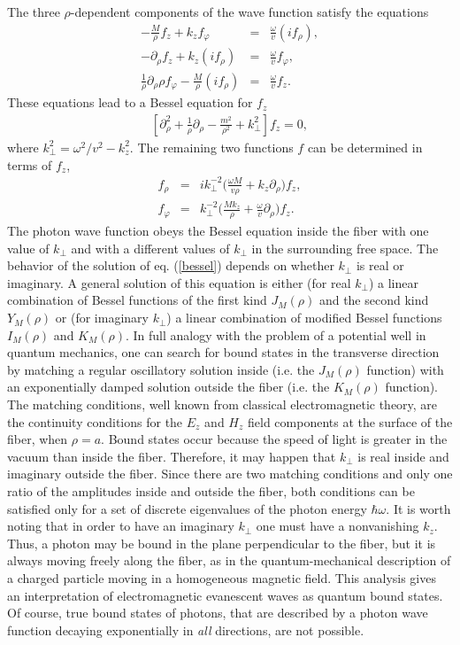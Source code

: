 \documentclass[11pt]{article}
\begin{document}
The three $\rho$-dependent components of the wave function satisfy the
equations
\begin{eqnarray}
-\frac{M}{\rho}f_z + k_z f_{\varphi} &=&
\frac{\omega}{v}(if_{\rho}),\label{cyl1}\\
-\partial_{\rho} f_z + k_z (if_{\rho}) &=&
\frac{\omega}{v}f_{\varphi},\label{cyl2}\\
\frac{1}{\rho}\partial_{\rho}\rho f_{\varphi} -
\frac{M}{\rho}(if_{\rho}) &=& \frac{\omega}{v}f_z.\label{cyl3}
\end{eqnarray}
These equations lead to a Bessel equation for $f_z$
\begin{eqnarray}
\left[\partial_{\rho}^2 + \frac{1}{\rho}\partial_{\rho} -
\frac{m^2}{\rho^2} + k_{\perp}^2\right]f_z = 0,\label{bessel}
\end{eqnarray}
where $k_{\perp}^2 = \omega^2/v^2 - k_z^2$. The remaining two functions $f$
can be determined in terms of $f_z$,
\begin{eqnarray}
 f_{\rho}
 &=& ik^{-2}_{\perp}\big(\frac{\omega M}{v\rho}
 + k_z\partial_{\rho}\big)f_z,\\
 f_{\varphi}
 &=& k^{-2}_{\perp}\big(\frac{M k_z}{\rho}
 + \frac{\omega}{v}\partial_{\rho}\big)f_z.
\end{eqnarray}
The photon wave function obeys the Bessel equation inside the fiber with one
value of $k_{\perp}$ and with a different values of $k_{\perp}$ in the surrounding free space. The behavior of the solution of eq. (\ref{bessel})
depends on whether $k_{\perp}$ is real or imaginary. A general solution of
this equation is either (for real $k_{\perp}$) a linear combination of Bessel functions of the first kind $J_M(\rho)$ and the second kind $Y_M(\rho)$ or
(for imaginary $k_{\perp}$) a linear combination of modified Bessel functions $I_M(\rho)$ and $K_M(\rho)$. In full analogy with the problem of a potential well in quantum mechanics, one can search for bound states in the transverse direction by matching a regular oscillatory solution inside (i.e. the $J_M(\rho)$ function) with an exponentially damped solution outside the fiber (i.e. the $K_M(\rho)$ function). The matching conditions, well known from classical electromagnetic theory, are the continuity conditions for the $E_z$ and $H_z$ field components at the surface of the fiber, when $\rho = a$. Bound states occur because the speed of light is greater in the vacuum than inside the fiber. Therefore, it may happen that $k_{\perp}$ is real inside and imaginary outside the fiber. Since there are two matching conditions and only one ratio of the amplitudes inside and outside the fiber, both conditions can be satisfied only for a set of discrete eigenvalues of the photon energy $\hbar\omega$. It is worth noting that in order to have an imaginary $k_{\perp}$ one must have a nonvanishing $k_z$. Thus, a photon may be bound in the plane perpendicular to the fiber, but it is always moving freely along the fiber, as in the quantum-mechanical description of a charged particle moving in a homogeneous magnetic field. This analysis gives an interpretation of electromagnetic evanescent waves as quantum bound states. Of course, true bound states of photons, that are described by a photon wave function decaying exponentially in {\em all} directions, are not possible.
\end{document}
